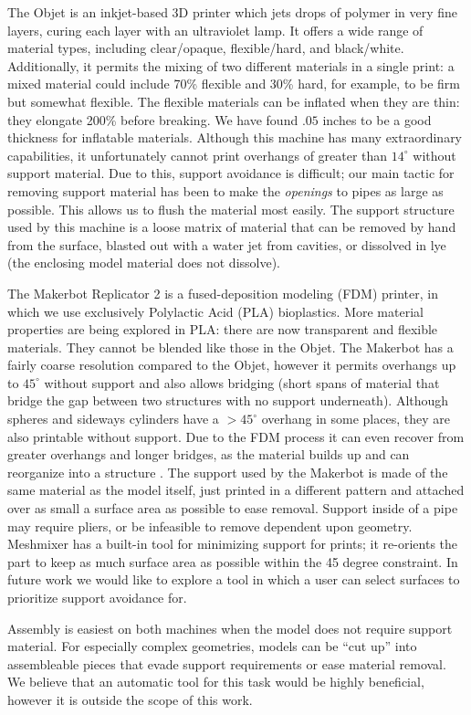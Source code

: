 The Objet is an inkjet-based 3D printer which jets drops of polymer in very fine layers, curing each layer with an ultraviolet lamp.  It offers a wide range of material types, including clear/opaque, flexible/hard, and black/white.  Additionally, it permits the mixing of two different materials in a single print: a mixed material could include 70\% flexible and 30\% hard, for example, to be firm but somewhat flexible.  The flexible materials can be inflated when they are thin: they elongate 200\% before breaking.  We have found $.05$ inches to be a good thickness for inflatable materials.  Although this machine has many extraordinary capabilities, it unfortunately cannot print overhangs of greater than $14^{\circ}$ without support material.  Due to this, support avoidance is difficult; our main tactic for removing support material has been to make the \emph{openings} to pipes as large as possible.  This allows us to flush the material most easily.  The support structure used by this machine is a loose matrix of material that can be removed by hand from the surface, blasted out with a water jet from cavities, or dissolved in lye (the enclosing model material does not dissolve).

The Makerbot Replicator 2 is a fused-deposition modeling (FDM) printer, in which we use exclusively Polylactic Acid (PLA) bioplastics.  More material properties are being explored in PLA: there are now transparent and flexible materials.  They cannot be blended like those in the Objet.  The Makerbot has a fairly coarse resolution compared to the Objet, however it permits overhangs up to $45^{\circ}$ without support and also allows bridging (short spans of material that bridge the gap between two structures with no support underneath).  Although spheres and sideways cylinders have a $>45^{\circ}$ overhang in some places, they are also printable without support.  Due to the FDM process it can even recover from greater overhangs and longer bridges, as the material builds up and can reorganize into a structure .  The support used by the Makerbot is made of the same material as the model itself, just printed in a different pattern and attached over as small a surface area as possible to ease removal.  Support inside of a pipe may require pliers, or be infeasible to remove dependent upon geometry.  Meshmixer has a built-in tool for minimizing support for prints; it re-orients the part to keep as much surface area as possible within the 45 degree constraint.  In future work we would like to explore a tool in which a user can select surfaces to prioritize support avoidance for.

Assembly is easiest on both machines when the model does not require support material.  For especially complex geometries, models can be ``cut up''  into assembleable pieces that evade support requirements or ease material removal.  We believe that an automatic tool for this task would be highly beneficial, however it is outside the scope of this work.